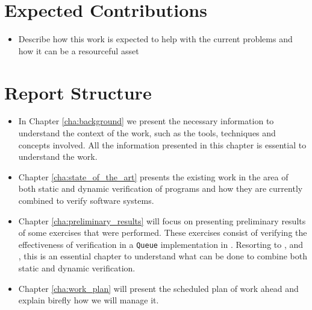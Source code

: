 \section{Expected Contributions}
\label{sec:expected_Contributions}

\begin{itemize}
    \item Describe how this work is expected to help with the current problems
    and how it can be a resourceful asset
\end{itemize}

\section{Report Structure}
\label{sec:report_structure}

\begin{itemize}
    \item In Chapter \ref{cha:background} we present the necessary information to understand
        the context of the work, such as the tools, techniques and concepts involved. All 
        the information presented in this chapter is essential to understand the work.
    \item Chapter \ref{cha:state_of_the_art} presents the existing work in the area of 
        both static and dynamic verification of \ocaml programs and how they are currently 
        combined to verify software systems.
    \item Chapter \ref{cha:preliminary_results} will focus on presenting preliminary 
        results of some exercises that were performed. These exercises consist of verifying 
        the effectiveness of verification in a \texttt{Queue} implementation in \ocaml. 
        Resorting to \gospel, \cameleer and \ortac, this is an essential chapter to understand 
        what can be done to combine both static and dynamic verification.
    \item Chapter \ref{cha:work_plan} will present the scheduled plan of work ahead and explain 
    birefly how we will manage it.
\end{itemize}